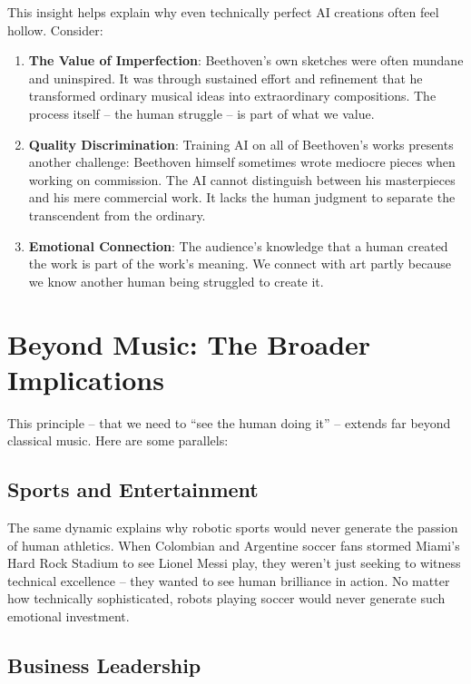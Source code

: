 \documentclass[
  Letterpaper,
]{scrbook}
\begin{document}
This insight helps explain why even technically perfect AI creations
often feel hollow. Consider:

\begin{enumerate}
\def\labelenumi{\arabic{enumi}.}
\item
  \textbf{The Value of Imperfection}: Beethoven's own sketches were
  often mundane and uninspired. It was through sustained effort and
  refinement that he transformed ordinary musical ideas into
  extraordinary compositions. The process itself -- the human struggle
  -- is part of what we value.
\item
  \textbf{Quality Discrimination}: Training AI on all of Beethoven's
  works presents another challenge: Beethoven himself sometimes wrote
  mediocre pieces when working on commission. The AI cannot distinguish
  between his masterpieces and his mere commercial work. It lacks the
  human judgment to separate
  the transcendent from the ordinary.
\item
  \textbf{Emotional Connection}: The audience's knowledge that a human
  created the work is part of the work's meaning. We connect with art
  partly because we know another human being struggled to create it.
\end{enumerate}

\section{Beyond Music: The Broader
Implications}\label{beyond-music-the-broader-implications}

This principle -- that we need to ``see the human doing it'' -- extends
far beyond classical music. Here are some parallels:

\subsection{Sports and Entertainment}\label{sports-and-entertainment}

The same dynamic explains why robotic sports would never generate the
passion of human athletics. When Colombian and Argentine soccer fans
stormed Miami's Hard Rock Stadium to see Lionel Messi play, they weren't
just seeking to witness technical excellence -- they wanted to see human
brilliance in action. No matter how technically sophisticated, robots
playing soccer would never generate such emotional investment.

\subsection{Business Leadership}\label{business-leadership}
\end{document}

